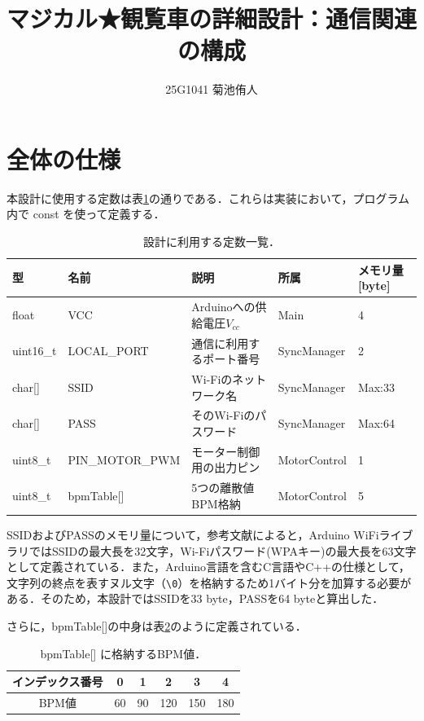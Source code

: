 \documentclass[uplatex,dvipdfmx]{jlreq}
\begin{document}
\title{マジカル★観覧車の詳細設計：通信関連の構成}
\author{25G1041 菊池侑人}
\maketitle

\tableofcontents

\newpage
\section{全体の仕様}
本設計に使用する定数は表\ref{tab:teisuu}の通りである．これらは実装において，プログラム内で const を使って定義する．

\begin{table}[H]
\centering
\caption{設計に利用する定数一覧．}
\label{tab:teisuu}
\begin{tabular}{lllll}
\hline
型 & 名前 & 説明 & 所属 & メモリ量 [byte] \\
\hline
float & VCC & Arduinoへの供給電圧$V_{cc}$ & Main & 4 \\
uint16\_t & LOCAL\_PORT & 通信に利用するポート番号 & SyncManager & 2 \\
char[] & SSID & Wi-Fiのネットワーク名 & SyncManager & Max:33 \\
char[] & PASS & そのWi-Fiのパスワード & SyncManager & Max:64 \\
uint8\_t & PIN\_MOTOR\_PWM & モーター制御用の出力ピン & MotorControl & 1 \\
uint8\_t & bpmTable[] & 5つの離散値BPM格納 & MotorControl & 5 \\
\hline
\end{tabular}
\end{table}

SSIDおよびPASSのメモリ量について，参考文献\cite{ref:Arduino_wifi}によると，Arduino WiFiライブラリではSSIDの最大長を32文字，Wi-Fiパスワード(WPAキー)の最大長を63文字として定義されている．また，Arduino言語を含むC言語やC++の仕様として，文字列の終点を表すヌル文字（\texttt{\textbackslash 0}）を格納するため1バイト分を加算する必要がある．そのため，本設計ではSSIDを33 byte，PASSを64 byteと算出した．

さらに，bpmTable[]の中身は表\ref{tab:bpmtable}のように定義されている．
\begin{table}[H]
\centering
\caption{bpmTable[] に格納するBPM値．}
\label{tab:bpmtable}
\begin{tabular}{c|ccccc}
\hline
インデックス番号 & 0 & 1 & 2 & 3 & 4 \\
\hline
BPM値 & 60 & 90 & 120 & 150 & 180 \\
\hline
\end{tabular}
\end{table}
\end{document}
